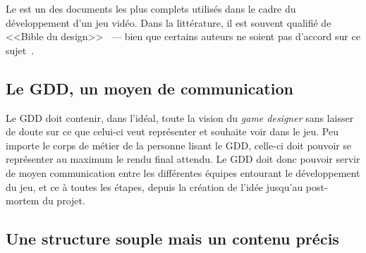 



Le  est un des documents les plus complets utilis\'es dans le cadre du développement d'un jeu vidéo.
Dans la littérature, il est souvent qualifié de <<Bible du design>>~\cite{GD_foundations_pedersen} --- bien que certains auteurs ne soient pas d'accord sur ce sujet~\cite{LevelUpRogers2014}. 

\subsection{Le GDD, un moyen de communication}


Le GDD doit contenir, dans l'idéal, toute la vision du \emph{game designer} sans laisser de doute sur ce que celui-ci veut représenter et souhaite voir dans le jeu.
Peu importe le corps de métier de la personne lisant le GDD, celle-ci doit pouvoir se représenter au maximum le rendu final attendu.
Le GDD doit donc pouvoir servir de moyen communication entre les différentes équipes entourant le développement du jeu, et ce \`a toutes les étapes, depuis la création de l'idée jusqu'au post-mortem du projet.

\subsection{Une structure souple mais un contenu précis}


